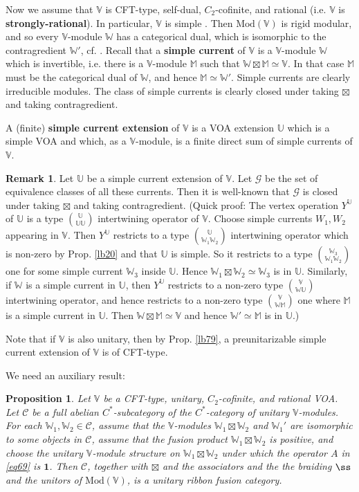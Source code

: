 \documentclass[11pt,b5paper,notitlepage]{article}
\theoremstyle{definition}
\newtheorem{rem}[df]{Remark}
\theoremstyle{plain}
\newtheorem{pp}[df]{Proposition}
\newcommand{\mc}{\mathcal}
\newcommand{\id}{\mathbf{1}}
\newcommand{\Vbb}{\mathbb V}
\newcommand{\Ubb}{\mathbb U}
\newcommand{\Wbb}{\mathbb W}
\newcommand{\Mbb}{\mathbb M}
\newcommand{\Mod}{\mathrm{Mod}}
\numberwithin{equation}{section}
\begin{document}
Now we assume that $\Vbb$ is CFT-type, self-dual, $C_2$-cofinite, and rational (i.e. $\Vbb$ is \textbf{strongly-rational}). In particular, $\Vbb$ is simple \cite[Prop. 4.6-(iv)]{CKLW18}. Then $\Mod(\Vbb)$ is rigid modular, and so every $\Vbb$-module $\Wbb$ has a categorical dual, which is isomorphic to the contragredient $\Wbb'$, cf. \cite{Hua08}. Recall that a \textbf{simple current} of $\Vbb$ is a $\Vbb$-module $\Wbb$ which is invertible, i.e. there is a $\Vbb$-module $\Mbb$ such that $\Wbb\boxtimes\Mbb\simeq\Vbb$. In that case $\Mbb$ must be the categorical dual of $\Wbb$, and hence $\Mbb\simeq\Wbb'$. Simple currents are clearly irreducible modules. The class of simple currents is clearly closed under taking $\boxtimes$ and taking contragredient.

A (finite) \textbf{simple current extension} of $\Vbb$ is a VOA extension $\Ubb$ which is a simple VOA and which, as a $\Vbb$-module, is a finite direct sum of simple currents of $\Vbb$. 

\begin{rem}\label{lb82}
Let $\Ubb$ be a simple current extension of $\Vbb$. Let $\mc G$ be the set of  equivalence classes of all these currents. Then it is well-known that $\mc G$ is closed under taking $\boxtimes$ and taking contragredient. (Quick proof: The vertex operation $Y^\Ubb$ of $\Ubb$ is a type $\Ubb\choose \Ubb\Ubb$ intertwining operator of $\Vbb$. Choose simple currents $W_1,W_2$ appearing in $\Vbb$. Then $Y^\Ubb$ restricts to a type $\Ubb\choose \Wbb_1\Wbb_2$ intertwining operator which is non-zero by Prop. \ref{lb20} and that $\Ubb$ is simple. So it restricts to a type $\Wbb_3\choose \Wbb_1\Wbb_2$ one for some simple current $\Wbb_3$ inside $\Ubb$. Hence $\Wbb_1\boxtimes\Wbb_2\simeq\Wbb_3$ is in $\Ubb$. Similarly, if $\Wbb$ is a simple current in $\Ubb$, then $Y^\Ubb$ restricts to a non-zero type $\Vbb\choose \Wbb\Ubb$ intertwining operator, and hence restricts to a non-zero type $\Vbb\choose \Wbb\Mbb$ one where $\Mbb$ is a simple current in $\Ubb$. Then $\Wbb\boxtimes\Mbb\simeq\Vbb$ and hence $\Wbb'\simeq\Mbb$ is in $\Ubb$.)
\end{rem}


Note that if $\Vbb$ is also unitary, then by Prop. \ref{lb79}, a preunitarizable simple current extension of $\Vbb$ is of CFT-type.






We need an auxiliary result:

\begin{pp}\label{lb81}
Let $\Vbb$ be a CFT-type, unitary, $C_2$-cofinite, and rational VOA. Let $\mc C$ be a full abelian $C^*$-subcategory of the $C^*$-category of unitary $\Vbb$-modules. For each $\Wbb_1,\Wbb_2\in\mc C$, assume that the $\Vbb$-modules $\Wbb_1\boxtimes\Wbb_2$ and $\Wbb_1'$ are  isomorphic to some objects in $\mc C$, assume that the fusion product $\Wbb_1\boxtimes\Wbb_2$ is positive, and choose the unitary $\Vbb$-module structure on $\Wbb_1\boxtimes\Wbb_2$ under which the operator $A$ in \eqref{eq69} is $\id$. Then $\mc C$, together with $\boxtimes$ and the associators and the the braiding $\ss$ and the unitors of $\Mod(\Vbb)$, is a unitary ribbon fusion category.
\end{pp}
\end{document}

